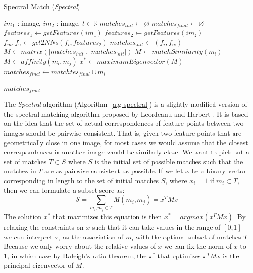 \begin{algorithm}[h!]
\caption{Spectral Match (\emph{Spectral})}
\label{alg-spectral}
\begin{algorithmic}
\Require $im_1$ : image, $im_2$ : image, $t \in \mathbb{R}$
\State $matches_{init}\gets \varnothing$
\State $matches_{final} \gets \varnothing$
\State $features_1 \gets getFeatures(im_1)$
\State $features_2 \gets getFeatures(im_2)$
	\State $f_m,f_n \gets get2NNs(f_i, features_2)$
	\State $matches_{init} \gets \left(f_i, f_m\right)$
\EndFor
\State $M \gets matrix(\left\vert matches_{init} \right\vert, \left\vert 
matches_{init} \right\vert)$
			\State $M \gets matchSimilarity(m_i)$
		\Else
			\State $M \gets affinity(m_i, m_j)$
		\EndIf
	\EndFor
\EndFor
\State $x^{*} \gets maximumEigenvector(M)$
		\State $matches_{final} \gets matchtes_{final} \cup m_i$
	\EndIf
\EndFor

\Return $matches_{final}$
\end{algorithmic}
\end{algorithm}

The \emph{Spectral} algorithm (Algorithm~\ref{alg-spectral}) is a 
slightly modified version of the spectral matching algorithm proposed by
Leordeanu and Herbert \cite{leordeanu2005spectral}. It is based on the 
idea that the set of actual correspondences of feature points between 
two images should be pairwise consistent. That is, given two feature 
points that are geometrically close in one image, for most cases we 
would assume that the closest correspondences in another image would be 
similarly close. We want to pick out a set of matches $T \subset S$ 
where $S$ is the initial set of possible matches such that the matches 
in $T$ are as pairwise consistent as possible. If we let $x$ be a binary 
vector corresponding in length to the set of initial matches $S$, where 
$x_i = 1$ if $m_i \subset T$, then we can formulate a subset-score as:
\begin{equation*}
	S = \sum_{m_i, m_j \in T} M(m_i, m_j) = x^TMx
\end{equation*}
The solution $x^{*}$ that maximizes this equation is then $x^{*} = 
argmax(x^TMx)$. By relaxing the constraints on $x$ such that it can take
values in the range of $\left[0, 1\right]$ we can interpret $x_i$ as the
association of $m_i$ with the optimal subset of matches $T$. Because we 
only worry about the relative values of $x$ we can fix the norm of $x$ 
to $1$, in which case by Raleigh's ratio theorem, the $x^{*}$ that 
optimizes $x^TMx$ is the principal eigenvector of $M$.

